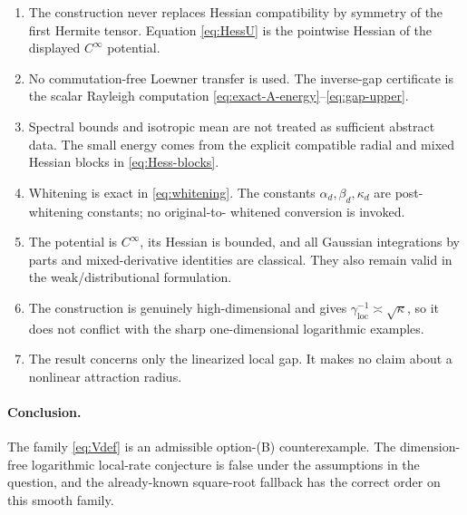 \documentclass[11pt]{article}
\numberwithin{equation}{section}
\newcommand{\loc}{\mathrm{loc}}
\begin{document}
\begin{enumerate}[leftmargin=2em,label=\arabic*.]
  \item The construction never replaces Hessian compatibility by symmetry of
  the first Hermite tensor.  Equation \eqref{eq:HessU} is the pointwise
  Hessian of the displayed $C^\infty$ potential.
  \item No commutation-free Loewner transfer is used.  The inverse-gap
  certificate is the scalar Rayleigh computation
  \eqref{eq:exact-A-energy}--\eqref{eq:gap-upper}.
  \item Spectral bounds and isotropic mean are not treated as sufficient
  abstract data.  The small energy comes from the explicit compatible radial
  and mixed Hessian blocks in \eqref{eq:Hess-blocks}.
  \item Whitening is exact in \eqref{eq:whitening}.  The constants
  $\alpha_d,\beta_d,\kappa_d$ are post-whitening constants; no original-to-
  whitened conversion is invoked.
  \item The potential is $C^\infty$, its Hessian is bounded, and all Gaussian
  integrations by parts and mixed-derivative identities are classical.  They
  also remain valid in the weak/distributional formulation.
  \item The construction is genuinely high-dimensional and gives
  $\gamma_{\loc}^{-1}\asymp\sqrt\kappa$, so it does not conflict with the
  sharp one-dimensional logarithmic examples.
  \item The result concerns only the linearized local gap.  It makes no claim
  about a nonlinear attraction radius.
\end{enumerate}

\paragraph{Conclusion.}
The family \eqref{eq:Vdef} is an admissible option-(B) counterexample.  The
dimension-free logarithmic local-rate conjecture is false under the assumptions
in the question, and the already-known square-root fallback has the correct
order on this smooth family.
\end{document}
